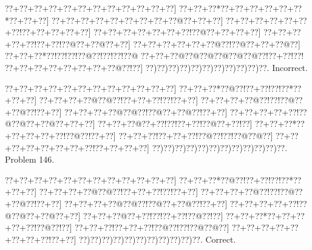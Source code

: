 \documentclass[a5paper]{article}
\begin{document}
\begin{center}
{\goo
\0??+\0??+\0??+\0??+\0??+\0??+\0??+\0??+\0??+\0??+\0??+\0??]
\0??+\0??+\0??*\0??+\0??+\0??+\0??+\0??+\0??*\0??+\0??+\0??]
\0??+\0??+\0??+\0??+\0??+\0??+\0??+\0??+\0??@\0??+\0??+\0??]
\0??+\0??+\0??+\0??+\0??+\0??+\0??!\0??+\0??+\0??+\0??+\0??]
\0??+\0??+\0??+\0??+\0??+\0??+\0??!\0??@\0??+\0??+\0??+\0??]
\0??+\0??+\0??+\0??+\0??!\0??+\0??!\0??@\0??+\0??@\0??+\0??]
\0??+\0??+\0??+\0??+\0??+\0??@\0??!\0??@\0??+\0??+\0??@\0??]
\0??+\0??+\0??*\0??!\0??!\0??!\0??@\0??!\0??!\0??!\0??@
\0??+\0??+\0??@\0??@\0??@\0??@\0??@\0??@\0??!\0??+\0??!\0??!
\0??+\0??+\0??+\0??+\0??+\0??+\0??+\0??@\0??!\0??]
\0??)\0??)\0??)\0??)\0??)\0??)\0??)\0??)\0??)\0??)\0??.
}
Incorrect. 

\end{center}
\newpage
\begin{center}
{\goo
\0??+\0??+\0??+\0??+\0??+\0??+\0??+\0??+\0??+\0??+\0??+\0??]
\0??+\0??+\0??*\0??@\0??!\0??+\0??!\0??!\0??*\0??+\0??+\0??]
\0??+\0??+\0??+\0??@\0??@\0??!\0??+\0??+\0??!\0??!\0??+\0??]
\0??+\0??+\0??+\0??@\0??!\0??!\0??@\0??+\0??@\0??!\0??+\0??]
\0??+\0??+\0??+\0??@\0??@\0??!\0??@\0??+\0??@\0??!\0??+\0??]
\0??+\0??+\0??+\0??+\0??!\0??@\0??@\0??+\0??@\0??+\0??+\0??]
\0??+\0??+\0??@\0??+\0??!\0??!\0??+\0??!\0??@\0??+\0??!\0??]
\0??+\0??+\0??*\0??+\0??+\0??+\0??+\0??!\0??@\0??!\0??+\0??]
\0??+\0??+\0??!\0??+\0??+\0??!\0??@\0??!\0??!\0??@\0??@\0??]
\0??+\0??+\0??+\0??+\0??+\0??+\0??+\0??!\0??+\0??+\0??+\0??]
\0??)\0??)\0??)\0??)\0??)\0??)\0??)\0??)\0??)\0??)\0??)\0??.
}
Problem 146.

\end{center}
\begin{center}
{\goo
\0??+\0??+\0??+\0??+\0??+\0??+\0??+\0??+\0??+\0??+\0??+\0??]
\0??+\0??+\0??*\0??@\0??!\0??+\0??!\0??!\0??*\0??+\0??+\0??]
\0??+\0??+\0??+\0??@\0??@\0??!\0??+\0??+\0??!\0??!\0??+\0??]
\0??+\0??+\0??+\0??@\0??!\0??!\0??@\0??+\0??@\0??!\0??+\0??]
\0??+\0??+\0??+\0??@\0??@\0??!\0??@\0??+\0??@\0??!\0??+\0??]
\0??+\0??+\0??+\0??+\0??!\0??@\0??@\0??+\0??@\0??+\0??]
\0??+\0??+\0??@\0??+\0??!\0??!\0??+\0??!\0??@\0??!\0??]
\0??+\0??+\0??*\0??+\0??+\0??+\0??+\0??!\0??@\0??!\0??]
\0??+\0??+\0??!\0??+\0??+\0??!\0??@\0??!\0??!\0??@\0??@\0??]
\0??+\0??+\0??+\0??+\0??+\0??+\0??+\0??!\0??+\0??]
\0??)\0??)\0??)\0??)\0??)\0??)\0??)\0??)\0??)\0??)\0??.
}
Correct. 

\end{center}
\end{document}
